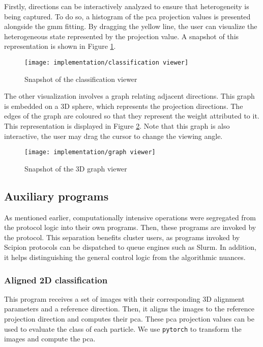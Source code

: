 \documentclass[../main.tex]{subfiles}
\begin{document}
Firstly, directions can be interactively analyzed to ensure that heterogeneity is being captured. To do so, a histogram of the \gls{pca} projection values is presented alongside the \gls{gmm} fitting. By dragging the yellow line, the user can visualize the heterogeneous state represented by the projection value. A snapshot of this representation is shown in Figure \ref{fig:4.2:classification_viewer}.

\begin{figure}[hbp]
    \centering
    \texttt{[image: implementation/classification viewer]}
    \caption{Snapshot of the classification viewer}
    \label{fig:4.2:classification_viewer}
\end{figure}

The other visualization involves a graph relating adjacent directions. This graph is embedded on a 3D sphere, which represents the projection directions. The edges of the graph are coloured so that they represent the weight attributed to it. This representation is displayed in Figure \ref{fig:4.2:graph_viewer}. Note that this graph is also interactive, the user may drag the cursor to change the viewing angle.

\begin{figure}[hbp]
    \centering
    \texttt{[image: implementation/graph viewer]}
    \caption{Snapshot of the 3D graph viewer}
    \label{fig:4.2:graph_viewer}
\end{figure}

\subsection{Auxiliary programs}
As mentioned earlier, computationally intensive operations were segregated from the protocol logic into their own programs. Then, these programs are invoked by the protocol. This separation benefits cluster users, as programs invoked by Scipion protocols can be dispatched to queue engines such as Slurm. In addition, it helps distinguishing the general control logic from the algorithmic nuances.

\subsubsection{Aligned 2D classification}
This program receives a set of images with their corresponding 3D alignment parameters and a reference direction. Then, it aligns the images to the reference projection direction and computes their \gls{pca}. These \gls{pca} projection values can be used to evaluate the class of each particle. We use \texttt{pytorch} to transform the images and compute the \gls{pca}.
\end{document}
